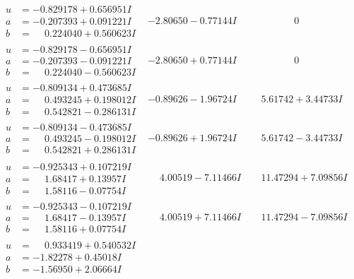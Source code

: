 \documentclass[1p]{elsarticle_modified}
\theoremstyle{definition}
\begin{document}
$$\begin{array}{c|c|c}
\begin{aligned}
u &= -0.829178 + 0.656951 I \\
a &= -0.207393 + 0.091221 I \\
b &= \phantom{-}0.224040 + 0.560623 I\end{aligned}
 & -2.80650 - 0.77144 I & \phantom{-0.000000 } 0 \\ \hline\begin{aligned}
u &= -0.829178 - 0.656951 I \\
a &= -0.207393 - 0.091221 I \\
b &= \phantom{-}0.224040 - 0.560623 I\end{aligned}
 & -2.80650 + 0.77144 I & \phantom{-0.000000 } 0 \\ \hline\begin{aligned}
u &= -0.809134 + 0.473685 I \\
a &= \phantom{-}0.493245 + 0.198012 I \\
b &= \phantom{-}0.542821 - 0.286131 I\end{aligned}
 & -0.89626 - 1.96724 I & \phantom{-}5.61742 + 3.44733 I \\ \hline\begin{aligned}
u &= -0.809134 - 0.473685 I \\
a &= \phantom{-}0.493245 - 0.198012 I \\
b &= \phantom{-}0.542821 + 0.286131 I\end{aligned}
 & -0.89626 + 1.96724 I & \phantom{-}5.61742 - 3.44733 I \\ \hline\begin{aligned}
u &= -0.925343 + 0.107219 I \\
a &= \phantom{-}1.68417 + 0.13957 I \\
b &= \phantom{-}1.58116 - 0.07754 I\end{aligned}
 & \phantom{-}4.00519 - 7.11466 I & \phantom{-}11.47294 + 7.09856 I \\ \hline\begin{aligned}
u &= -0.925343 - 0.107219 I \\
a &= \phantom{-}1.68417 - 0.13957 I \\
b &= \phantom{-}1.58116 + 0.07754 I\end{aligned}
 & \phantom{-}4.00519 + 7.11466 I & \phantom{-}11.47294 - 7.09856 I \\ \hline\begin{aligned}
u &= \phantom{-}0.933419 + 0.540532 I \\
a &= -1.82278 + 0.45018 I \\
b &= -1.56950 + 2.06664 I\end{aligned}

\end{array}$$
\end{document}
